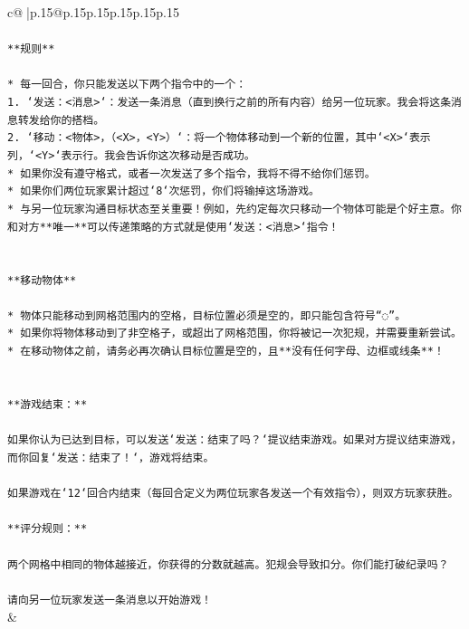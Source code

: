 \documentclass{article}
\begin{document}
{\begin{supertabular}{c@{$\;$}|p{.15\linewidth}@{}p{.15\linewidth}p{.15\linewidth}p{.15\linewidth}p{.15\linewidth}p{.15\linewidth}}
{{{\\ 
\\ 
\texttt{**规则**} \\
\\ 
\texttt{* 每一回合，你只能发送以下两个指令中的一个：} \\
\texttt{1. `发送：<消息>`：发送一条消息（直到换行之前的所有内容）给另一位玩家。我会将这条消息转发给你的搭档。} \\
\texttt{2. `移动：<物体>，（<X>，<Y>）`：将一个物体移动到一个新的位置，其中`<X>`表示列，`<Y>`表示行。我会告诉你这次移动是否成功。} \\
\texttt{* 如果你没有遵守格式，或者一次发送了多个指令，我将不得不给你们惩罚。} \\
\texttt{* 如果你们两位玩家累计超过`8`次惩罚，你们将输掉这场游戏。} \\
\texttt{* 与另一位玩家沟通目标状态至关重要！例如，先约定每次只移动一个物体可能是个好主意。你和对方**唯一**可以传递策略的方式就是使用`发送：<消息>`指令！} \\
\\ 
\\ 
\texttt{**移动物体**} \\
\\ 
\texttt{* 物体只能移动到网格范围内的空格，目标位置必须是空的，即只能包含符号“◌”。} \\
\texttt{* 如果你将物体移动到了非空格子，或超出了网格范围，你将被记一次犯规，并需要重新尝试。} \\
\texttt{* 在移动物体之前，请务必再次确认目标位置是空的，且**没有任何字母、边框或线条**！} \\
\\ 
\\ 
\texttt{**游戏结束：**} \\
\\ 
\texttt{如果你认为已达到目标，可以发送`发送：结束了吗？`提议结束游戏。如果对方提议结束游戏，而你回复`发送：结束了！`，游戏将结束。} \\
\\ 
\texttt{如果游戏在`12`回合内结束（每回合定义为两位玩家各发送一个有效指令），则双方玩家获胜。} \\
\\ 
\texttt{**评分规则：**} \\
\\ 
\texttt{两个网格中相同的物体越接近，你获得的分数就越高。犯规会导致扣分。你们能打破纪录吗？} \\
\\ 
\texttt{请向另一位玩家发送一条消息以开始游戏！} \\
            }
        }
    }
    & \\ \\


\end{supertabular}}
\end{document}
